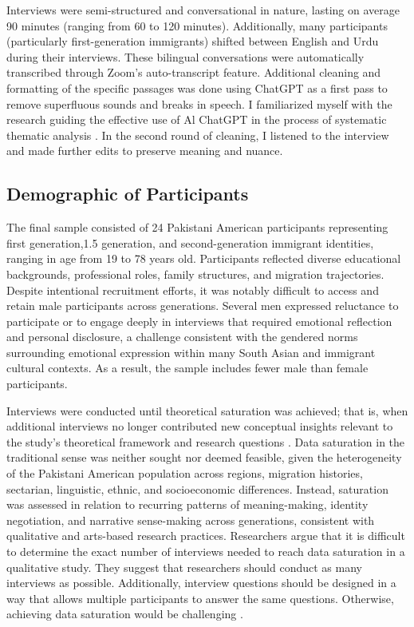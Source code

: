 Interviews were semi-structured and conversational in nature, lasting on average 90 minutes (ranging from 60 to 120 minutes). Additionally, many participants (particularly first-generation immigrants) shifted between English and Urdu during their interviews. These bilingual conversations were automatically transcribed through Zoom’s auto-transcript feature. Additional cleaning and formatting of the specific passages was done using ChatGPT as a first pass to remove superfluous sounds and breaks in speech. I familiarized myself with the research guiding the effective use of Al ChatGPT in the process of systematic thematic analysis \citep{naeemThematicAnalysisArtificial2025}. In the second round of cleaning, I listened to the interview and made further edits to preserve meaning and nuance.

\subsection{Demographic of Participants}

The final sample consisted of 24 Pakistani American participants representing first generation,1.5 generation, and second-generation immigrant identities, ranging in age from 19 to 78 years old. Participants reflected diverse educational backgrounds, professional roles, family structures, and migration trajectories. Despite intentional recruitment efforts, it was notably difficult to access and retain male participants across generations. Several men expressed reluctance to participate or to engage deeply in interviews that required emotional reflection and personal disclosure, a challenge consistent with the gendered norms surrounding emotional expression within many South Asian and immigrant cultural contexts. As a result, the sample includes fewer male than female participants.

Interviews were conducted until theoretical saturation was achieved; that is, when additional interviews no longer contributed new conceptual insights relevant to the study’s theoretical framework and research questions \citep{faulknerQualitativeMethodsCommunication2024}. Data saturation in the traditional sense was neither sought nor deemed feasible, given the heterogeneity of the Pakistani American population across regions, migration histories, sectarian, linguistic, ethnic, and socioeconomic differences. Instead, saturation was assessed in relation to recurring patterns of meaning-making, identity negotiation, and narrative sense-making across generations, consistent with qualitative and arts-based research practices. Researchers argue that it is difficult to determine the exact number of interviews needed to reach data saturation in a qualitative study. They suggest that researchers should conduct as many interviews as possible. Additionally, interview questions should be designed in a way that allows multiple participants to answer the same questions. Otherwise, achieving data saturation would be challenging \citep{saundersSaturationQualitativeResearch2018, fuschAreWeThere2015}. 

